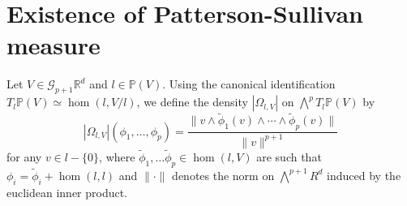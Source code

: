 \documentclass{report}
\begin{document}
\section{Existence of Patterson-Sullivan measure}\label{sec:MeasureExistence}
\begin{definition}
    Let $V \in \mathcal G_{p+1}{\mathbb R^d}$ and $l \in \mathbb P(V)$.
    Using the canonical identification $T_l \mathbb P(V) \simeq \hom (l, V/l)$, we define the density $|\Omega_{l, V}|$ on $\bigwedge^p T_l \mathbb P(V)$ by
    \[
        |\Omega_{l,V}|(\phi_1, \ldots, \phi_p) = 
        \frac{\| v \wedge \tilde \phi_1(v) \wedge \cdots \wedge \tilde \phi_p (v) \|}{\|v\|^{p+1}}
    \]
    for any $v \in l - \{ 0\}$, where $\tilde \phi_1, \ldots \tilde \phi_p \in \hom(l, V)$ are such that $\phi_i = \tilde \phi_i + \hom(l, l)$ and $\| \cdot \|$ denotes the norm on $\bigwedge^{p+1} R^d$ induced by the euclidean inner product.
\end{definition}
\end{document}
